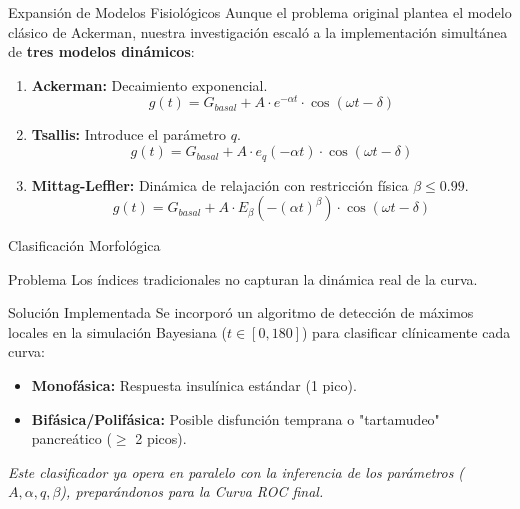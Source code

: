 \documentclass{beamer}
\begin{document}
\begin{frame}{Expansión de Modelos Fisiológicos}
    Aunque el problema original plantea el modelo clásico de Ackerman, nuestra investigación escaló a la implementación simultánea de \textbf{tres modelos dinámicos}:
    \vspace{0.3cm}
    
    \begin{enumerate}
        \item \textbf{Ackerman:} Decaimiento exponencial.
        \begin{equation*}
            g(t) = G_{basal} + A \cdot e^{-\alpha t} \cdot \cos(\omega t - \delta)
        \end{equation*}
        \item \textbf{Tsallis:} Introduce el parámetro $q$.
        \begin{equation*}
            g(t) = G_{basal} + A \cdot e_q(-\alpha t) \cdot \cos(\omega t - \delta)
        \end{equation*}
        \item \textbf{Mittag-Leffler:} Dinámica de relajación con restricción física $\beta \le 0.99$.
        \begin{equation*}
            g(t) = G_{basal} + A \cdot E_\beta(-(\alpha t)^\beta) \cdot \cos(\omega t - \delta)
        \end{equation*}
    \end{enumerate}
\end{frame}

\begin{frame}{Clasificación Morfológica}
    \begin{block}{Problema}
        Los índices tradicionales no capturan la dinámica real de la curva.
    \end{block}
    
    \begin{block}{Solución Implementada}
        Se incorporó un algoritmo de detección de máximos locales en la simulación Bayesiana ($t \in [0, 180]$) para clasificar clínicamente cada curva:
        \begin{itemize}
            \item \textbf{Monofásica:} Respuesta insulínica estándar (1 pico).
            \item \textbf{Bifásica/Polifásica:} Posible disfunción temprana o "tartamudeo" pancreático ($\ge$ 2 picos).
        \end{itemize}
    \end{block}
    
    \textit{Este clasificador ya opera en paralelo con la inferencia de los parámetros ($A, \alpha, q, \beta$), preparándonos para la Curva ROC final.}
\end{frame}
\end{document}
